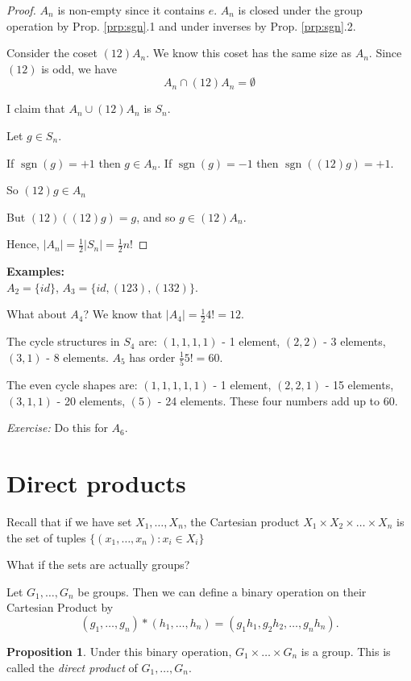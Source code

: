 \documentclass{article}
\theoremstyle{definition}
\newtheorem{proposition}{Proposition}
\DeclareMathOperator{\sgn}{sgn}
\begin{document}
\begin{proof}
  $A_n$ is non-empty since it contains $e$. $A_n$ is closed under the group operation by Prop. \ref{prp:sgn}.1 and under inverses by Prop. \ref{prp:sgn}.2.

  Consider the coset $(12) A_n$. We know this coset has the same size as $A_n.$ Since $(1 2)$ is odd, we have
\begin{equation*}
  A_n \cap (1 2) A_n  = \emptyset
\end{equation*}

I claim that $A_n \cup (1 2) A_n $ is $S_n$. 

Let $g \in S_n$.

If $\sgn(g) = +1$ then $g \in A_n$.
If $\sgn(g) = -1$ then $\sgn\left( (12) g \right)= +1$.

So $(12)g \in A_n$

But $(1 2)\left( (1 2) g \right)=g$, and so $g \in (1 2)A_n$.

Hence, $|A_n|=\frac{1}{2}|S_n|=\frac{1}{2}n!$

\end{proof}

\textbf{Examples:}\\
$A_2 = \{ id \}$, $A_3 = \{id, (123), (132)\}$.

What about $A_4$? We know that $|A_4|=\frac{1}{2}4!=12$.

The cycle structures in $S_4$ are:
$(1,1,1,1)$ - 1 element, $(2,2)$ - 3 elements, $(3,1)$ - 8 elements.
$A_5$ has order $\frac{1}{5}5! = 60$.

The even cycle shapes are:
$(1,1,1,1,1)$ - 1 element, $(2,2,1)$ - 15 elements, $(3,1,1)$ - 20 elements, $(5)$ - 24 elements. These four numbers add up to 60.

\emph{Exercise:} Do this for $A_6$.

\section{Direct products}
Recall that if we have set $X_1, \ldots, X_n$, the Cartesian product 
$X_1 \times X_2 \times \ldots \times X_n$ is the set of tuples $\{(x_1, \ldots,x_n) : x_i \in X_i\}$

What if the sets are actually groups?

Let $G_1 , \ldots, G_n$ be groups. Then we can define a binary operation on their Cartesian Product by
$$(g_1, \ldots, g_n) * (h_1, \ldots , h_n) = (g_1h_1, g_2h_2, \ldots, g_nh_n).$$
\begin{proposition}
Under this binary operation, $G_1 \times \ldots \times G_n$ is a group. This is called the \textit{direct product} of $G_1 , \ldots, G_n$.
\end{proposition}
\end{document}
